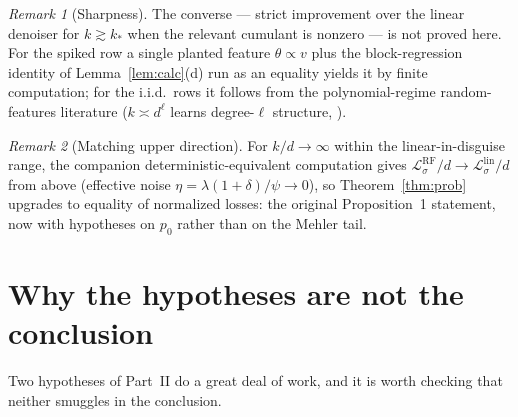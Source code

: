 \documentclass[11pt]{article}
\theoremstyle{remark}
\newtheorem{remark}{Remark}
\begin{document}
\begin{remark}[Sharpness]
The converse --- strict improvement over the linear denoiser for $k \gtrsim k_*$ when the relevant cumulant is nonzero --- is not proved here. For the spiked row a single planted feature $\theta \propto v$ plus the block-regression identity of Lemma~\ref{lem:calc}(d) run as an equality yields it by finite computation; for the i.i.d.\ rows it follows from the polynomial-regime random-features literature ($k \asymp d^\ell$ learns degree-$\ell$ structure, \cite{MMM21,Ghorbani}).
\end{remark}

\begin{remark}[Matching upper direction]
For $k/d \to \infty$ within the linear-in-disguise range, the companion deterministic-equivalent computation gives $\mathcal L^{\mathrm{RF}}_\sigma/d \to \mathcal L^{\mathrm{lin}}_\sigma/d$ from above (effective noise $\eta = \lambda(1+\delta)/\psi \to 0$), so Theorem~\ref{thm:prob} upgrades to equality of normalized losses: the original Proposition~1 statement, now with hypotheses on $p_0$ rather than on the Mehler tail.
\end{remark}

\section{Why the hypotheses are not the conclusion}\label{sec:noncirc}

Two hypotheses of Part~II do a great deal of work, and it is worth checking that neither smuggles in the conclusion.
\end{document}
